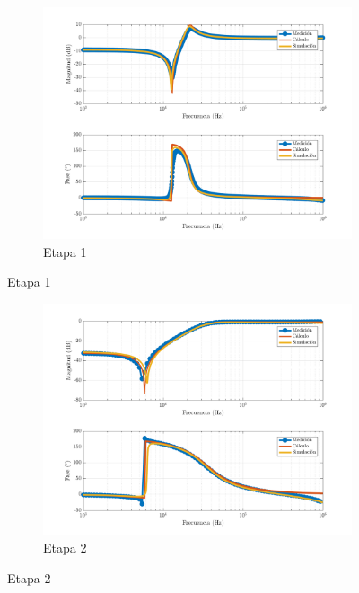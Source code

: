 \documentclass[../../tc_tp5_main.tex]{subfiles}
\begin{document}
\begin{figure}[H]
	\centering
	\begin{subfigure}[t]{0.8\textwidth}
		\centering
		\includegraphics[width=\textwidth]{imagenes/etapa_1_bode.png}
		\caption{Etapa 1}
		\label{fig:ej3_bode_etapa_1}
	\end{subfigure}
\end{figure}
\begin{figure}[H]
\ContinuedFloat	
	\centering
	\begin{subfigure}[t]{0.8\textwidth}
		\centering
		\includegraphics[width=\textwidth]{imagenes/etapa_2_bode.png}
		\caption{Etapa 2}
		\label{fig:ej3_bode_etapa_2}
	\end{subfigure}
\end{figure}
\end{document}
